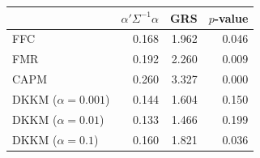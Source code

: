 \begin{tabular}{lrrr}
\toprule
 & $\alpha'\Sigma^{-1}\alpha$ & GRS & $p$-value \\
\midrule
FFC & 0.168 & 1.962 & 0.046 \\
FMR & 0.192 & 2.260 & 0.009 \\
CAPM & 0.260 & 3.327 & 0.000 \\
DKKM ($\alpha=0.001$) & 0.144 & 1.604 & 0.150 \\
DKKM ($\alpha=0.01$) & 0.133 & 1.466 & 0.199 \\
DKKM ($\alpha=0.1$) & 0.160 & 1.821 & 0.036 \\
\bottomrule
\end{tabular}
